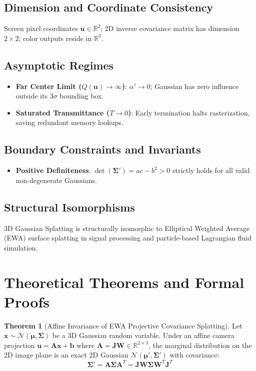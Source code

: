 \documentclass[11pt,a4paper]{article}
\theoremstyle{definition}
\newtheorem{theorem}{\textbf{Theorem}}[section]
\begin{document}
\subsection{Dimension and Coordinate Consistency}
Screen pixel coordinates $\mathbf{u} \in \mathbb{R}^2$; 2D inverse covariance matrix has dimension $2 \times 2$; color outputs reside in $\mathbb{R}^3$.

\subsection{Asymptotic Regimes}
\begin{itemize}
    \item \textbf{Far Center Limit ($Q(\mathbf{u}) \to \infty$)}: $\alpha' \to 0$; Gaussian has zero influence outside its $3\sigma$ bounding box.
    \item \textbf{Saturated Transmittance ($T \to 0$)}: Early termination halts rasterization, saving redundant memory lookups.
\end{itemize}

\subsection{Boundary Constraints and Invariants}
\begin{itemize}
    \item \textbf{Positive Definiteness}: $\operatorname{det}(\boldsymbol{\Sigma}') = a c - b^2 > 0$ strictly holds for all valid non-degenerate Gaussians.
\end{itemize}

\subsection{Structural Isomorphisms}
3D Gaussian Splatting is structurally isomorphic to Elliptical Weighted Average (EWA) surface splatting in signal processing and particle-based Lagrangian fluid simulation.

\section{Theoretical Theorems and Formal Proofs}

\begin{theorem}[Affine Invariance of EWA Projective Covariance Splatting]
Let $\mathbf{x} \sim \mathcal{N}(\boldsymbol{\mu}, \boldsymbol{\Sigma})$ be a 3D Gaussian random variable. Under an affine camera projection $\mathbf{u} = \mathbf{A} \mathbf{x} + \mathbf{b}$ where $\mathbf{A} = \mathbf{J} \mathbf{W} \in \mathbb{R}^{2 \times 3}$, the marginal distribution on the 2D image plane is an exact 2D Gaussian $\mathcal{N}(\boldsymbol{\mu}', \boldsymbol{\Sigma}')$ with covariance:
{\boldmath
\begin{equation}
\boldsymbol{\Sigma}' = \mathbf{A} \boldsymbol{\Sigma} \mathbf{A}^T = \mathbf{J} \mathbf{W} \boldsymbol{\Sigma} \mathbf{W}^T \mathbf{J}^T
\end{equation}
}
\end{theorem}
\end{document}
